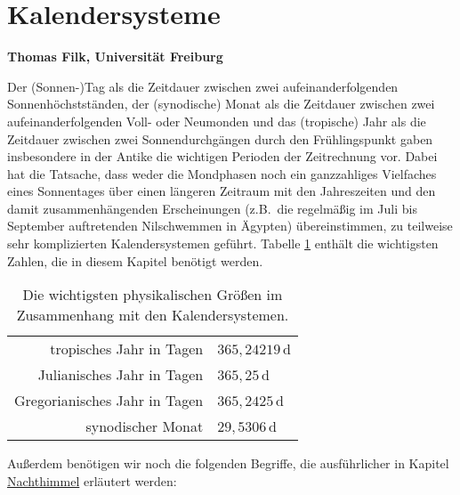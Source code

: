 
\setcounter{page}{1}
\setcounter{section}{0}
\setcounter{figure}{0}
\setcounter{equation}{0}
\setcounter{table}{0}
\setcounter{footnote}{0}

\section*{Kalendersysteme}
\vspace{0.2cm}
\noindent
{\bf Thomas Filk, Universit\"at Freiburg}
\vspace{1cm}

\label{chap_Kalender}

\noindent
Der (Sonnen-)Tag als die Zeitdauer zwischen zwei aufeinanderfolgenden Sonnenh\"ochstst\"anden, der 
(synodische) Monat als die Zeitdauer zwischen zwei aufeinanderfolgenden Voll- oder Neumonden und das 
(tropische) Jahr als die Zeitdauer zwischen zwei Sonnendurchg\"angen durch den Fr\"uhlingspunkt
gaben insbesondere in der Antike die wichtigen Perioden der Zeitrechnung vor. Dabei hat
die Tatsache, dass weder die Mondphasen noch ein ganzzahliges Vielfaches eines Sonnentages 
\"uber einen l\"angeren Zeitraum mit den Jahreszeiten und den damit zusammenh\"angenden 
Erscheinungen (z.B.\ die regelm\"a\ss ig im Juli bis September auftretenden Nilschwemmen in \"Agypten)
\"ubereinstimmen, zu teilweise sehr komplizierten Kalendersystemen gef\"uhrt. 
Tabelle \ref{tab_Kal} enth\"alt die wichtigsten Zahlen, die in diesem Kapitel ben\"otigt werden.

\begin{table}[htb]
\begin{tabular}{r|l}
tropisches Jahr in Tagen &  $365, 24219$\,d   \\
Julianisches Jahr in Tagen &  $365,25$\,d \\
Gregorianisches Jahr in Tagen & $ 365,2425$\,d \\
synodischer Monat &  $29,5306$\,d \\
\end{tabular}
\caption{\label{tab_Kal}%
Die wichtigsten physikalischen Gr\"o\ss en im Zusammenhang mit den
Kalendersystemen.}
\end{table}

Au\ss erdem ben\"otigen wir noch die folgenden Begriffe, die ausf\"uhrlicher in
Kapitel \hyperref[chap_Nachthimmel]{Nachthimmel} erl\"autert werden:


